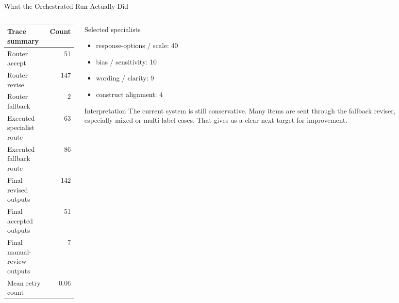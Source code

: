 \documentclass[aspectratio=169]{beamer}
\newcommand{\slidetablefont}{\scriptsize}
\begin{document}
\begin{frame}{What the Orchestrated Run Actually Did}
  \begin{columns}[T,onlytextwidth]
    \begin{column}{0.52\textwidth}
      \slidetablefont
      \begin{table}
        \centering
        \begin{tabular}{lr}
          \toprule
          Trace summary & Count \\
          \midrule
          Router accept & 51 \\
          Router revise & 147 \\
          Router fallback & 2 \\
          Executed specialist route & 63 \\
          Executed fallback route & 86 \\
          Final revised outputs & 142 \\
          Final accepted outputs & 51 \\
          Final manual-review outputs & 7 \\
          Mean retry count & 0.06 \\
          \bottomrule
        \end{tabular}
      \end{table}
    \end{column}
    \begin{column}{0.45\textwidth}
      \small
      \begin{block}{Selected specialists}
        \begin{itemize}
          \item response-options / scale: 40
          \item bias / sensitivity: 10
          \item wording / clarity: 9
          \item construct alignment: 4
        \end{itemize}
      \end{block}

      \begin{alertblock}{Interpretation}
        The current system is still conservative. Many items are sent through the fallback reviser, especially mixed or multi-label cases. That gives us a clear next target for improvement.
      \end{alertblock}
    \end{column}
  \end{columns}
\end{frame}
\end{document}
